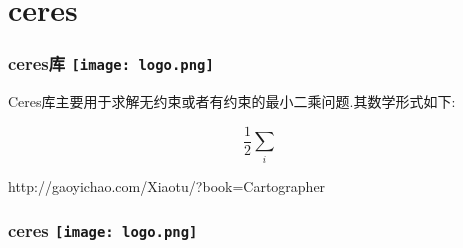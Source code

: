 \section{ceres}

\begin{frame}
\frametitle{ceres库 \hfill \texttt{[image: logo.png]}}

Ceres库主要用于求解无约束或者有约束的最小二乘问题.其数学形式如下:

\begin{equation}
	\frac{1}{2} \sum_i 
\end{equation}


http://gaoyichao.com/Xiaotu/?book=Cartographer%
\end{frame}


\begin{comment}

\end{comment}
\begin{frame}
\frametitle{ceres \hfill \texttt{[image: logo.png]}}


\end{frame}

